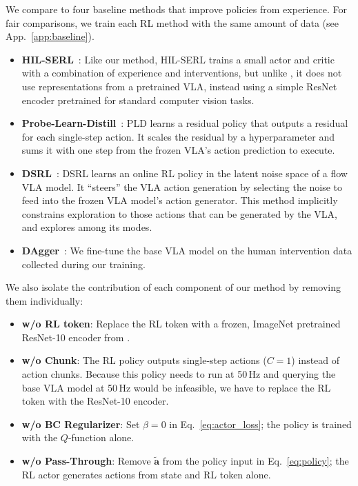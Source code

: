 We compare \MethodName{} to four baseline methods that improve policies from experience. For fair comparisons, we train each RL method with the same amount of data (see App.~\ref{app:baseline}).

\begin{itemize}[leftmargin=*, itemsep=2pt]
    
    \item \textbf{HIL-SERL}~\cite{luo2024precise}: Like our method, HIL-SERL trains a small actor and critic with a combination of experience and interventions, but unlike \MethodName{}, it does not use representations from a pretrained VLA, instead using a simple ResNet encoder pretrained for standard computer vision tasks.
    \item \textbf{Probe-Learn-Distill}~\cite{xiao2025selfimprovingvisionlanguageactionmodelsdata}: PLD learns a residual policy that outputs a residual for each single-step action. It scales the residual by a hyperparameter and sums it with one step from the frozen VLA's action prediction to execute. 
    \item \textbf{DSRL}~\cite{Wagenmaker2025DSRL}: DSRL learns an online RL policy in the latent noise space of a flow VLA model. It ``steers'' the VLA action generation by selecting the noise to feed into the frozen VLA model's action generator. This method implicitly constrains exploration to those actions that can be generated by the VLA, and explores among its modes.
    \item \textbf{DAgger}~\cite{rossdagger,kelly2019hgdaggerinteractiveimitationlearning}: We fine-tune the base VLA model on the human intervention data collected during our training. 
\end{itemize}
We also isolate the contribution of each component of our method by removing them individually:
\begin{itemize}[leftmargin=*, itemsep=2pt]
    \item \textbf{w/o RL token}: Replace the RL token with a frozen, ImageNet pretrained ResNet-10 encoder from \citep{luo2024serl}.
    \item \textbf{w/o Chunk}: The RL policy outputs single-step actions ($C{=}1$) instead of action chunks. Because this policy needs to run at 50\,Hz and querying the base VLA model at 50\,Hz would be infeasible, we have to replace the RL token with the ResNet-10 encoder. 
    \item \textbf{w/o BC Regularizer}: Set $\beta{=}0$ in Eq.~\eqref{eq:actor_loss}; the policy is trained with the $Q$-function alone.
    \item \textbf{w/o Pass-Through}: Remove $\tilde{\mathbf{a}}$ from the policy input in Eq.~\eqref{eq:policy}; the RL actor generates actions from state and RL token alone.
\end{itemize}

